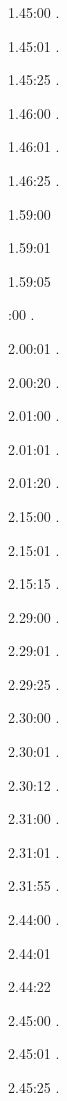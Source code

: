 \documentclass[italian]{article}
\begin{document}
1.45:00   .

1.45:01   .

1.45:25   .

1.46:00   .

1.46:01   .

1.46:25   .

1.59:00   

1.59:01   

1.59:05   

:00  .

2.00:01   . 

2.00:20  .

2.01:00   . 

2.01:01  .

2.01:20   . 

2.15:00   . 

2.15:01   . 

2.15:15   . 

2.29:00   . 

2.29:01   . 

2.29:25   . 

2.30:00   .

2.30:01   .

2.30:12   .

2.31:00   .

2.31:01   .

2.31:55   .

2.44:00   .

2.44:01   

2.44:22   

2.45:00   .

2.45:01   .

2.45:25   .
\end{document}
